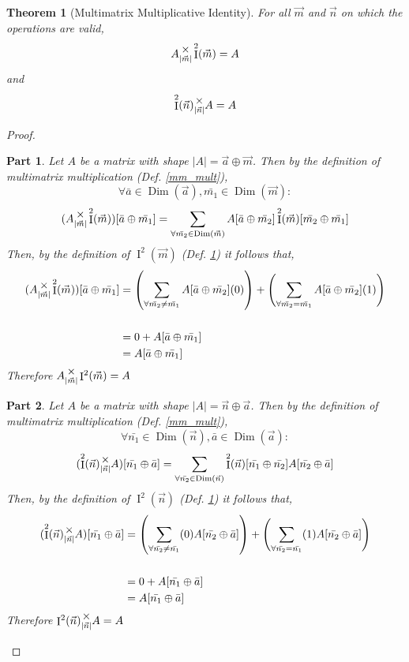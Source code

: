 \documentclass[12pt]{article}
\theoremstyle{definition}
\theoremstyle{plain}
\newtheorem{theorem}{Theorem}[section]
\theoremstyle{ppart}
\newtheorem{ppart}{Part}
\DeclareMathOperator{\Dim}{Dim}
\DeclareMathOperator{\Ident}{I}
\newcommand{\mmult}[1]{\text{\raisebox{1ex}{$\underset{#1}{\times}$}}}
\begin{document}
\begin{theorem}[Multimatrix Multiplicative Identity]
\label{mm_ident}
For all $\vec{m}$ and $\vec{n}$ on which the operations are valid,
\[
 A \mmult{|\vec{m}|} \Ident^2(\vec{m}) = A
\]
and
\[
 \Ident^2(\vec{n}) \mmult{|\vec{n}|} A = A
\]
\end{theorem}
\begin{proof}
\begin{ppart}
Let $A$ be a matrix with shape $|A| = \vec{a} \oplus \vec{m}$.
Then by the definition of multimatrix multiplication (Def. \ref{mm_mult}),
\[ \forall \bar{a} \in \Dim(\vec{a}), \bar{m_1} \in \Dim(\vec{m}) : \]
\[
 (A \mmult{|\vec{m}|} \Ident^2(\vec{m}))[\bar{a} \oplus \bar{m_1}]
 =
 \sum_{\forall \bar{m_2} \in \Dim(\vec{m})}
 A[\bar{a} \oplus \bar{m_2}] \Ident^2(\vec{m})[\bar{m_2} \oplus \bar{m_1}]
\]
Then, by the definition of $\Ident^2(\vec{m})$ (Def. \ref{mm_ident}) it follows
that,
\begin{align*}
 (A \mmult{|\vec{m}|} \Ident^2(\vec{m}))[\bar{a} \oplus \bar{m_1}]
 &=
 \left(
  \sum_{\forall \bar{m_2} \ne \bar{m_1}}
  A[\bar{a} \oplus \bar{m_2}] (0)
 \right)
 +
 \left(
  \sum_{\forall \bar{m_2} = \bar{m_1}}
  A[\bar{a} \oplus \bar{m_2}] (1)
 \right) \\
 \\
 &= 0 + A[\bar{a} \oplus \bar{m_1}] \\
 &= A[\bar{a} \oplus \bar{m_1}]
\end{align*}
Therefore $A \mmult{|\vec{m}|} \Ident^2(\vec{m}) = A$
\end{ppart}
\begin{ppart}
Let $A$ be a matrix with shape $|A| = \vec{n} \oplus \vec{a}$.
Then by the definition of multimatrix multiplication (Def. \ref{mm_mult}),
\[ \forall  \bar{n_1} \in \Dim(\vec{n}), \bar{a} \in \Dim(\vec{a}) : \]
\[
 (\Ident^2(\vec{n}) \mmult{|\vec{n}|} A)[\bar{n_1} \oplus \bar{a}]
 =
 \sum_{\forall \bar{n_2} \in \Dim(\vec{n})}
 \Ident^2(\vec{n})[\bar{n_1} \oplus \bar{n_2}]A[\bar{n_2} \oplus \bar{a}] 
\]
Then, by the definition of $\Ident^2(\vec{n})$ (Def. \ref{mm_ident}) it follows
that,
\begin{align*}
 (\Ident^2(\vec{n}) \mmult{|\vec{n}|} A)[\bar{n_1} \oplus \bar{a}]
 &=
 \left(
  \sum_{\forall \bar{n_2} \ne \bar{n_1}}
  (0) A[\bar{n_2} \oplus \bar{a}]
 \right)
 +
 \left(
  \sum_{\forall \bar{n_2} = \bar{n_1}}
  (1) A[\bar{n_2} \oplus \bar{a}]
 \right) \\
 \\
 &= 0 + A[\bar{n_1} \oplus \bar{a}] \\
 &= A[\bar{n_1} \oplus \bar{a}]
\end{align*}
Therefore $\Ident^2(\vec{n}) \mmult{|\vec{n}|} A = A$
\end{ppart}
\end{proof}
\end{document}
